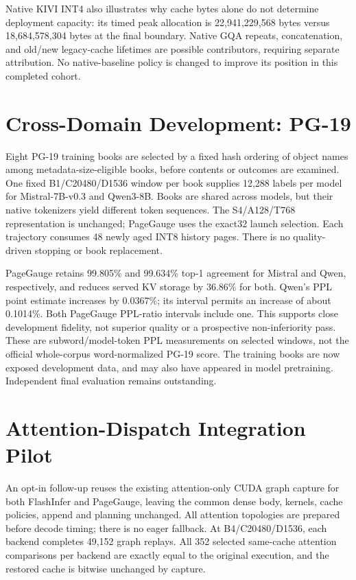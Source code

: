 \documentclass{article}
\begin{document}
Native KIVI INT4 also illustrates why cache bytes alone do not determine
deployment capacity: its timed peak allocation is 22,941,229,568 bytes versus
18,684,578,304 bytes at the final boundary. Native GQA repeats, concatenation,
and old/new legacy-cache lifetimes are possible contributors, requiring
separate attribution. No native-baseline policy is changed to improve its
position in this completed cohort.

\clearpage
\section{Cross-Domain Development: PG-19}
Eight PG-19 training books are selected by a fixed hash ordering of object
names among metadata-size-eligible books, before contents or outcomes are
examined. One fixed B1/C20480/D1536 window per book supplies 12,288 labels per
model for Mistral-7B-v0.3 and Qwen3-8B. Books are shared across models, but their
native tokenizers yield different token sequences. The S4/A128/T768
representation is unchanged; PageGauge uses the exact32 launch selection.
Each trajectory consumes 48 newly aged INT8 history pages. There is no
quality-driven stopping or book replacement.

\begin{table}[ht]
\caption{Eight PG-19 TRAIN books per model. M7: Mistral-7B-v0.3; Q8: Qwen3-8B.
Own HF model-token PPL is 6.42158 and 12.08988, respectively.
Intervals are descriptive paired-book bootstrap intervals, not final TEST
or prospective non-inferiority results.}
\label{tab:books}\centering\footnotesize

\end{table}

PageGauge retains 99.805\% and 99.634\% top-1 agreement for Mistral and Qwen,
respectively, and reduces served KV storage by 36.86\% for both. Qwen's PPL
point estimate increases by 0.0367\%; its interval permits an increase of about
0.1014\%. Both PageGauge PPL-ratio intervals include one. This supports close
development fidelity, not superior quality or a prospective non-inferiority pass.
These are subword/model-token PPL measurements on selected windows, not the
official whole-corpus word-normalized PG-19 score. The training books are now
exposed development data, and may also have appeared in model pretraining.
Independent final evaluation remains outstanding.

\section{Attention-Dispatch Integration Pilot}
An opt-in follow-up reuses the existing attention-only CUDA graph capture
for both FlashInfer and PageGauge, leaving the common dense body, kernels,
cache policies, append and planning unchanged. All attention topologies are
prepared before decode timing; there is no eager fallback. At
B4/C20480/D1536, each backend completes 49,152 graph replays. All 352 selected
same-cache attention comparisons per backend are exactly equal to the original
execution, and the restored cache is bitwise unchanged by capture.
\end{document}
